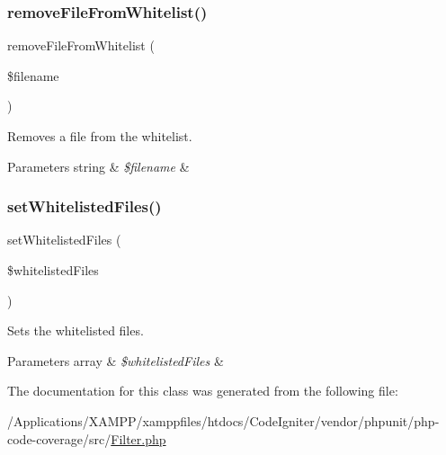 \subsubsection{\texorpdfstring{remove\+File\+From\+Whitelist()}{removeFileFromWhitelist()}}
{\footnotesize\ttfamily remove\+File\+From\+Whitelist (\begin{DoxyParamCaption}\item[{}]{\$filename }\end{DoxyParamCaption})}

Removes a file from the whitelist.


\begin{DoxyParams}[1]{Parameters}
string & {\em \$filename} & \\
\hline
\end{DoxyParams}
\mbox{\label{class_sebastian_bergmann_1_1_code_coverage_1_1_filter_a3c5b94ecdcfc786a5a593c66b0151bba}} 
\subsubsection{\texorpdfstring{set\+Whitelisted\+Files()}{setWhitelistedFiles()}}
{\footnotesize\ttfamily set\+Whitelisted\+Files (\begin{DoxyParamCaption}\item[{}]{\$whitelisted\+Files }\end{DoxyParamCaption})}

Sets the whitelisted files.


\begin{DoxyParams}[1]{Parameters}
array & {\em \$whitelisted\+Files} & \\
\hline
\end{DoxyParams}


The documentation for this class was generated from the following file\+:\begin{DoxyCompactItemize}
\item 
/\+Applications/\+X\+A\+M\+P\+P/xamppfiles/htdocs/\+Code\+Igniter/vendor/phpunit/php-\/code-\/coverage/src/\mbox{\hyperlink{phpunit_2php-code-coverage_2src_2_filter_8php}{Filter.\+php}}\end{DoxyCompactItemize}
